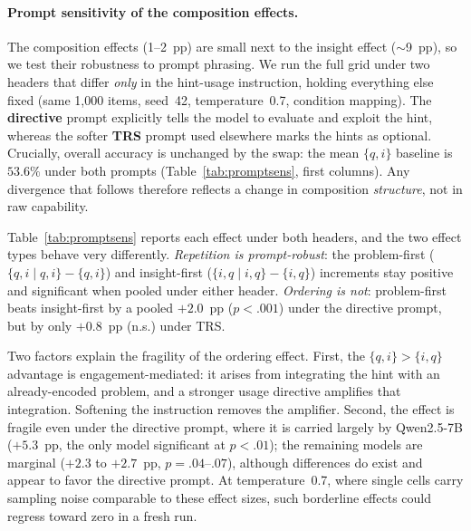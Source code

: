 
\paragraph{Prompt sensitivity of the composition effects.}
The composition effects (1--2~pp) are small next to the insight effect
($\sim$9~pp), so we test their robustness to prompt phrasing. We run the full
grid under two headers that differ \emph{only} in the hint-usage instruction,
holding everything else fixed (same 1{,}000 items, seed~42, temperature~0.7,
condition mapping). The \textbf{directive} prompt explicitly tells the model to
evaluate and exploit the hint, whereas the softer \textbf{TRS} prompt used
elsewhere marks the hints as optional. Crucially, overall accuracy is unchanged
by the swap: the mean $\{q,i\}$ baseline is $53.6\%$ under both prompts
(Table~\ref{tab:promptsens}, first columns). Any divergence that follows
therefore reflects a change in composition \emph{structure}, not in raw
capability.

Table~\ref{tab:promptsens} reports each effect under both headers, and the two
effect types behave very differently. \emph{Repetition is prompt-robust}: the
problem-first ($\{q,i{\mid}q,i\}-\{q,i\}$) and insight-first
($\{i,q{\mid}i,q\}-\{i,q\}$) increments stay positive and significant when
pooled under either header. \emph{Ordering is not}: problem-first beats
insight-first by a pooled $+2.0$~pp ($p<.001$) under the directive prompt, but
by only $+0.8$~pp (n.s.) under TRS.

Two factors explain the fragility of the ordering effect. First, the
$\{q,i\}>\{i,q\}$ advantage is engagement-mediated: it arises from integrating
the hint with an already-encoded problem, and a stronger usage directive
amplifies that integration. Softening the instruction removes the amplifier.
Second, the effect is fragile even under the directive prompt, where it is
carried largely by Qwen2.5-7B ($+5.3$~pp, the only model significant at
$p<.01$); the remaining models are marginal ($+2.3$ to $+2.7$~pp,
$p=.04$--$.07$), although differences do exist and appear to favor the directive
prompt. At temperature~0.7, where single cells carry sampling noise comparable
to these effect sizes, such borderline effects could regress toward zero in a
fresh run.

